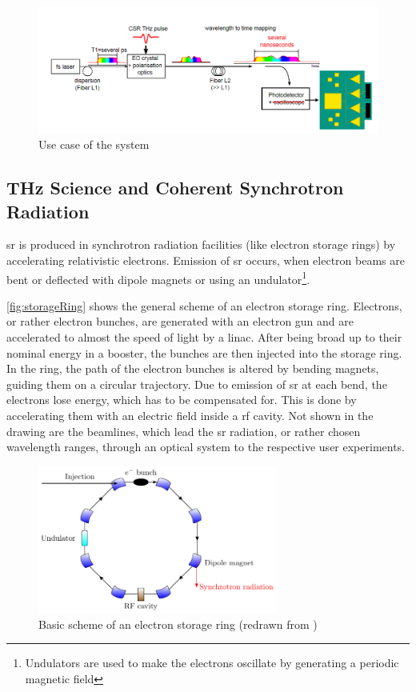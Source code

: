 \begin{figure}[tbh]
	\centering
	\includegraphics[width=\textwidth]{chap/02-theory/img/motivation}
	\caption{Use case of the system}
	\label{fig:motivation}
\end{figure}

\subsection{THz Science and Coherent Synchrotron Radiation}
\Gls{sr} is produced in synchrotron radiation facilities (like electron storage rings) by accelerating relativistic electrons.
Emission of \gls{sr} occurs, when electron beams are bent or deflected with dipole magnets or using an undulator\footnote{Undulators are used to make the electrons oscillate by generating a periodic magnetic field}. 

\autoref{fig:storageRing} shows the general scheme of an electron storage ring.
Electrons, or rather electron bunches, are generated with an electron gun and are accelerated to almost the speed of light by a \gls{linac}.
After being broad up to their nominal energy in a booster, the bunches are then injected into the storage ring.
In the ring, the path of the electron bunches is altered by bending magnets, guiding them on a circular trajectory.
Due to emission of \gls{sr} at each bend, the electrons lose energy, which has to be compensated for.
This is done by accelerating them with an electric field inside a \gls{rf} cavity.
Not shown in the drawing are the beamlines, which lead the \gls{sr} radiation, or rather chosen wavelength ranges, through an optical system to the respective user experiments. \cite{roussel2014} \cite{rota2018}

\begin{figure}[tbh]
	\centering
	\includegraphics[width=0.7\textwidth]{chap/02-theory/img/synchrotron}
	\caption{Basic scheme of an electron storage ring (redrawn from \cite{roussel2014})}
	\label{fig:storageRing}
\end{figure}
